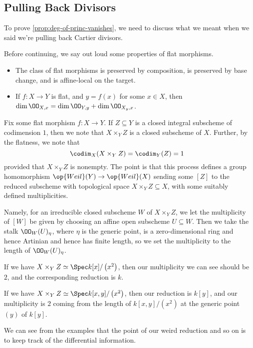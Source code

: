 \documentclass[../notes.tex]{subfiles}
\begin{document}
\subsection{Pulling Back Divisors}
To prove \autoref{prop:deg-of-princ-vanishes}, we need to discuss what we meant when we said we're pulling back Cartier divisors.
\begin{remark}
	Before continuing, we say out loud some properties of flat morphisms.
	\begin{itemize}
		\item The class of flat morphisms is preserved by composition, is preserved by base change, and is affine-local on the target.
		\item If $f\colon X\to Y$ is flat, and $y=f(x)$ for some $x\in X$, then $\dim\OO_{X,x}=\dim\OO_{Y,y}+\dim\OO_{X_y,x}$.
	\end{itemize}
\end{remark}
Fix some flat morphism $f\colon X\to Y$. If $Z\subseteq Y$ is a closed integral subscheme of codimension $1$, then we note that $X\times_YZ$ is a closed subscheme of $X$. Further, by the flatness, we note that
\[\codim_X(X\times_YZ)=\codim_Y(Z)=1\]
provided that $X\times_YZ$ is nonempty. The point is that this process defines a group homomorphism $\op{Weil}(Y)\to\op{Weil}(X)$ sending some $[Z]$ to the reduced subscheme with topological space $X\times_YZ\subseteq X$, with some suitably defined multiplicities.

Namely, for an irreducible closed subscheme $W$ of $X\times_YZ$, we let the multiplicity of $[W]$ be given by choosing an affine open subscheme $U\subseteq W$. Then we take the stalk $\OO_W(U)_\eta$, where $\eta$ is the generic point, is a zero-dimensional ring and hence Artinian and hence has finite length, so we set the multiplicity to the length of $\OO_W(U)_\eta$.
\begin{example}
	If we have $X\times_YZ\simeq\Spec k[x]/\left(x^2\right)$, then our multiplicity we can see should be $2$, and the corresponding reduction is $k$.
\end{example}
\begin{example}
	If we have $X\times_YZ\simeq\Spec k[x,y]/\left(x^2\right)$, then our reduction is $k[y]$, and our multiplicity is $2$ coming from the length of $k[x,y]/\left(x^2\right)$ at the generic point $(y)$ of $k[y]$.
\end{example}
We can see from the examples that the point of our weird reduction and so on is to keep track of the differential information.
\end{document}

